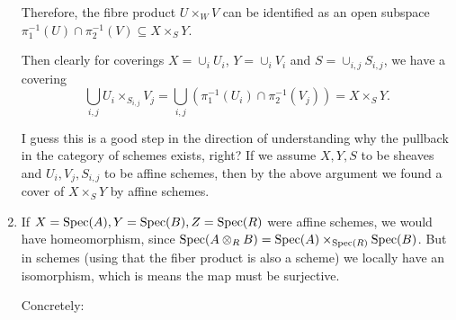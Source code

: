\begin{exercise}{1}
\begin{enumerate}
{            %

            Therefore, the fibre product $U \times_W V$ can be identified as an
            open subspace $\pi^{-1}_1(U) \cap \pi^{-1}_2(V) \subseteq X \times_S
            Y$.

            Then clearly for coverings $X = \cup_i U_i$, $Y = \cup_i V_i$ and $S =
            \cup_{i, j} S_{i, j}$, we have a covering
            \begin{equation*}
                \bigcup_{i, j} U_i \times_{S_{i, j}} V_j = \bigcup_{i, j}
                (\pi^{-1}_1(U_i) \cap \pi^{-1}_2(V_j)) = X \times_S Y.
            \end{equation*}

            I guess this is a good step in the direction of understanding why the
            pullback in the category of schemes exists, right? If we assume $X, Y,
            S$ to be sheaves and $U_i, V_j, S_{i,j}$ to be affine schemes, then by
            the above argument we found a cover of $X\times_S Y$ by affine schemes.}

        \item{
                If $X = \operatorname{Spec}(A), Y = \operatorname{Spec}(B), Z = \operatorname{Spec}(R)$ were affine
                schemes, we would have homeomorphism, since $\operatorname{Spec}(A \otimes_R
                B) = \operatorname{Spec}(A) \times_{\operatorname{Spec}(R)} \operatorname{Spec}(B)$.
                But in schemes (using that the fiber product is also a scheme)
                we locally have an isomorphism, which is means the map must be
                surjective.

                Concretely:

        }
    \end{enumerate}
\end{exercise}

